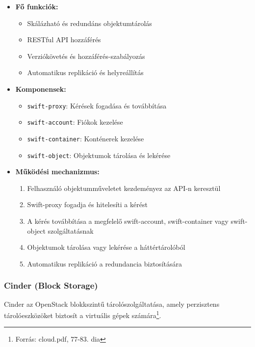 \documentclass[a4paper,12pt]{article}
\begin{document}
    \begin{itemize}
        \item \textbf{Fő funkciók:}
        \begin{itemize}
            \item Skálázható és redundáns objektumtárolás
            \item RESTful API hozzáférés
            \item Verziókövetés és hozzáférés-szabályozás
            \item Automatikus replikáció és helyreállítás
        \end{itemize}

        \item \textbf{Komponensek:}
        \begin{itemize}
            \item \texttt{swift-proxy}: Kérések fogadása és továbbítása
            \item \texttt{swift-account}: Fiókok kezelése
            \item \texttt{swift-container}: Konténerek kezelése
            \item \texttt{swift-object}: Objektumok tárolása és lekérése
        \end{itemize}

        \item \textbf{Működési mechanizmus:}
        \begin{enumerate}
            \item Felhasználó objektumműveletet kezdeményez az API-n keresztül
            \item Swift-proxy fogadja és hitelesíti a kérést
            \item A kérés továbbítása a megfelelő swift-account, swift-container vagy swift-object szolgáltatásnak
            \item Objektumok tárolása vagy lekérése a háttértárolóból
            \item Automatikus replikáció a redundancia biztosítására
        \end{enumerate}
    \end{itemize}

    \subsubsection{Cinder (Block Storage)}

    Cinder az OpenStack blokkszintű tárolószolgáltatása, amely perzisztens tárolóeszközöket biztosít a virtuális gépek számára\footnote{Forrás: cloud.pdf, 77-83. dia}.
\end{document}
